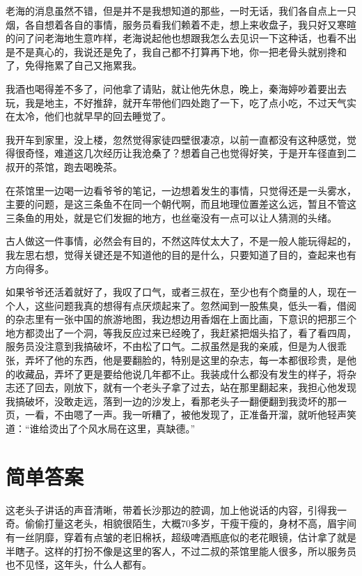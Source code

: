 老海的消息虽然不错，但是并不是我想知道的那些，一时无话，我们各自点上一只烟，各自想着各自的事情，服务员看我们赖着不走，想上来收盘子，我只好又寒暄的问了问老海地生意咋样，老海说起他也想跟我怎么去见识一下这种话，也看不出是不是真心的，我说还是免了，我自己都不打算再下地，你一把老骨头就别搀和了，免得拖累了自己又拖累我。

我酒也喝得差不多了，问他拿了请贴，就让他先休息，晚上，秦海婷吵着要出去玩，我是地主，不好推辞，就开车带他们四处跑了一下，吃了点小吃，不过天气实在太冷，他们也就早早的回去睡觉了。

我开车到家里，没上楼，忽然觉得家徒四壁很凄凉，以前一直都没有这种感觉，觉得很奇怪，难道这几次经历让我沧桑了？想着自己也觉得好笑，于是开车径直到二叔开的茶馆，跑去喝晚茶。

在茶馆里一边喝一边看爷爷的笔记，一边想着发生的事情，只觉得还是一头雾水，主要的问题，是这三条鱼不在同一个朝代啊，而且地理位置差这么远，暂且不管这三条鱼的用处，就是它们发掘的地方，也丝毫没有一点可以让人猜测的头绪。

古人做这一件事情，必然会有目的，不然这阵仗太大了，不是一般人能玩得起的，我左思右想，觉得关键还是不知道他的目的是什么，只要知道了目的，查起来也有方向得多。

如果爷爷还活着就好了，我叹了口气，或者三叔在，至少也有个商量的人，现在一个人，这些问题我真的想得有点厌烦起来了。忽然闻到一股焦臭，低头一看，借阅的杂志里有一张中国的旅游地图，我边想边用香烟在上面比画，下意识的把那三个地方都烫出了一个洞，等我反应过来已经晚了，我赶紧把烟头掐了，看了看四周，服务员没注意到我搞破坏，不由松了口气。二叔虽然是我的亲戚，但是为人很乖张，弄坏了他的东西，他是要翻脸的，特别是这里的杂志，每一本都很珍贵，是他的收藏品，弄坏了更是要给他说几年都不止。我装成什么都没有发生的样子，将杂志还了回去，刚放下，就有一个老头子拿了过去，站在那里翻起来，我担心他发现我搞破坏，没敢走远，落到一边的沙发上，看那老头子一翻便翻到我烫坏的那一页，一看，不由嗯了一声。我一听糟了，被他发现了，正准备开溜，就听他轻声笑道：“谁给烫出了个风水局在这里，真缺德。”

\chapter{简单答案}

这老头子讲话的声音清晰，带着长沙那边的腔调，加上他说话的内容，引得我一奇。偷偷打量这老头，相貌很陌生，大概70多岁，干瘦干瘦的，身材不高，眉宇间有一丝阴靡，穿着有点皱的老旧棉袄，超级啤酒瓶底似的老花眼镜，估计拿了就是半瞎子。这样的打扮不像是这里的客人，不过二叔的茶馆里能人很多，所以服务员也不见怪，这年头，什么人都有。

